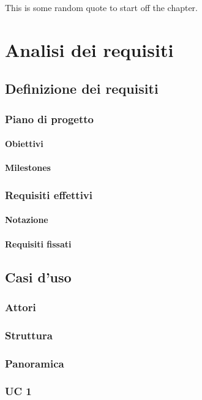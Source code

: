 
\begin{savequote}[75mm]
This is some random quote to start off the chapter.
\end{savequote}
\chapter{Analisi dei requisiti}
\section{Definizione dei requisiti}
\subsection{Piano di progetto}
\subsubsection{Obiettivi}
\subsubsection{Milestones}
\subsection{Requisiti effettivi}
\subsubsection{Notazione}
\subsubsection{Requisiti fissati}
\section{Casi d'uso}
\subsection{Attori}
\subsection{Struttura}
\subsection{Panoramica}
\subsection{UC 1}



